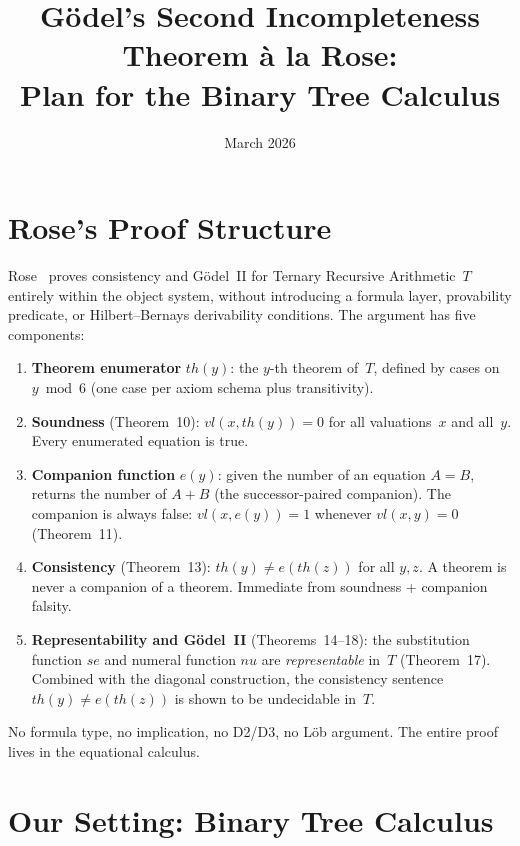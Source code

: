 \documentclass[11pt]{article}
\title{G\"odel's Second Incompleteness Theorem \`a la Rose:\\
  Plan for the Binary Tree Calculus}
\author{}
\date{March 2026}
\begin{document}
\maketitle

\section{Rose's Proof Structure}

Rose~\cite{rose1961} proves consistency and G\"odel~II for Ternary
Recursive Arithmetic~$T$ entirely within the object system, without
introducing a formula layer, provability predicate, or Hilbert--Bernays
derivability conditions.  The argument has five components:

\begin{enumerate}
\item \textbf{Theorem enumerator} $th(y)$: the $y$-th theorem of~$T$,
  defined by cases on $y \bmod 6$ (one case per axiom schema plus
  transitivity).

\item \textbf{Soundness} (Theorem~10): $vl(x, th(y)) = 0$ for all
  valuations~$x$ and all~$y$.  Every enumerated equation is true.

\item \textbf{Companion function} $e(y)$: given the number of an
  equation $A = B$, returns the number of $A \mathbin{+} B$
  (the successor-paired companion).  The companion is always false:
  $vl(x, e(y)) = 1$ whenever $vl(x, y) = 0$ (Theorem~11).

\item \textbf{Consistency} (Theorem~13): $th(y) \neq e(th(z))$ for
  all $y, z$.  A theorem is never a companion of a theorem.  Immediate
  from soundness + companion falsity.

\item \textbf{Representability and G\"odel~II} (Theorems~14--18):
  the substitution function $se$ and numeral function $nu$ are
  \emph{representable} in~$T$ (Theorem~17).  Combined with the
  diagonal construction, the consistency sentence
  $th(y) \neq e(th(z))$ is shown to be undecidable in~$T$.
\end{enumerate}

\noindent
No formula type, no implication, no D2/D3, no L\"ob argument.
The entire proof lives in the equational calculus.


\section{Our Setting: Binary Tree Calculus}
\end{document}
